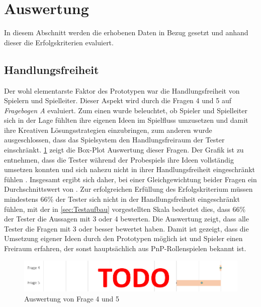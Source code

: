 \section{Auswertung}
\label{sec:Auswertung}

In diesem Abschnitt werden die erhobenen Daten in Bezug gesetzt und anhand dieser die Erfolgskriterien evaluiert.


\subsection{Handlungsfreiheit}
\label{sec:Handlungsfreiheit}
Der wohl elementarste Faktor des Prototypen war die Handlungsfreiheit von Spielern und Spielleiter. Dieser Aspekt wird durch die Fragen 4 und 5 auf \emph{Fragebogen A} evaluiert. Zum einen wurde beleuchtet, ob Spieler und Spielleiter sich in der Lage fühlten ihre eigenen Ideen im Spielfluss umzusetzen und damit ihre Kreativen Lösungsstrategien einzubringen, zum anderen wurde ausgeschlossen, dass das Spielsystem den Handlungsfreiraum der Tester einschränkt.\newline
\ref{fig:questions_4_5} zeigt die Box-Plot Auswertung dieser Fragen. Der Grafik ist zu entnehmen, dass die Tester während der Probespiels ihre Ideen vollständig umsetzen  konnten und sich nahezu nicht in ihrer Handlungsfreiheit eingeschränkt fühlen . Insgesamt ergibt sich daher, bei einer Gleichgewichtung beider Fragen ein Durchschnittswert von . Zur erfolgreichen Erfüllung des Erfolgskriterium müssen mindestens 66\% der Tester sich nicht in der Handlungsfreiheit eingeschränkt fühlen, mit der in \ref{sec:Testaufbau} vorgestellten Skala bedeutet dies, dass 66\% der Tester die Aussagen mit 3 oder 4 bewerten.\newline
Die Auswertung zeigt, dass alle Tester die Fragen mit 3 oder besser bewertet haben. Damit ist gezeigt, dass die Umsetzung eigener Ideen durch den Prototypen möglich ist und Spieler einen Freiraum erfahren, der sonst hauptsächlich aus PnP-Rollenspielen bekannt ist.

\begin{figure}
	\centering
		\includegraphics[width=1.00\textwidth]{media/2questions_temp.png}
	\caption{Auswertung von Frage 4 und 5}
	\label{fig:questions_4_5}
\end{figure}
	


